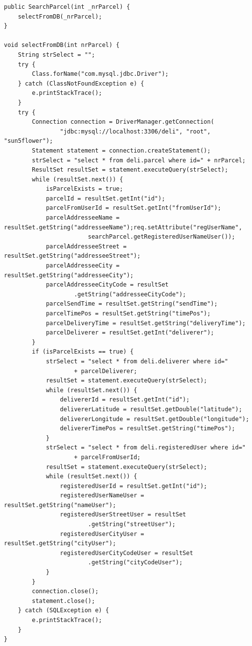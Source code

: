 \documentclass[eng,printmode,oneside]{mgr}
\begin{document}
\begin{lstlisting}[caption=Klasa reprezentująca
połączenie z bazą danych i pobierająca wszystkie dane o
przesyłce,label=searchparcel.java]
public SearchParcel(int _nrParcel) {
	selectFromDB(_nrParcel); 
}

void selectFromDB(int nrParcel) {
	String strSelect = "";
	try {
		Class.forName("com.mysql.jdbc.Driver");
	} catch (ClassNotFoundException e) {
		e.printStackTrace();
	}
	try {
		Connection connection = DriverManager.getConnection(
				"jdbc:mysql://localhost:3306/deli", "root", "sun5flower");
		Statement statement = connection.createStatement();
		strSelect = "select * from deli.parcel where id=" + nrParcel;
		ResultSet resultSet = statement.executeQuery(strSelect);
		while (resultSet.next()) {
			isParcelExists = true;
			parcelId = resultSet.getInt("id");
			parcelFromUserId = resultSet.getInt("fromUserId");
			parcelAddresseeName = resultSet.getString("addresseeName");req.setAttribute("regUserName",
						searchParcel.getRegisteredUserNameUser());
			parcelAddresseeStreet = resultSet.getString("addresseeStreet");
			parcelAddresseeCity = resultSet.getString("addresseeCity");
			parcelAddresseeCityCode = resultSet
					.getString("addresseeCityCode");
			parcelSendTime = resultSet.getString("sendTime");
			parcelTimePos = resultSet.getString("timePos");
			parcelDeliveryTime = resultSet.getString("deliveryTime");
			parcelDeliverer = resultSet.getInt("deliverer");
		}
		if (isParcelExists == true) {
			strSelect = "select * from deli.deliverer where id="
					+ parcelDeliverer;
			resultSet = statement.executeQuery(strSelect);
			while (resultSet.next()) {
				delivererId = resultSet.getInt("id");
				delivererLatitude = resultSet.getDouble("latitude");
				delivererLongitude = resultSet.getDouble("longitude");
				delivererTimePos = resultSet.getString("timePos");
			}
			strSelect = "select * from deli.registeredUser where id="
					+ parcelFromUserId;
			resultSet = statement.executeQuery(strSelect);
			while (resultSet.next()) {
				registeredUserId = resultSet.getInt("id");
				registeredUserNameUser = resultSet.getString("nameUser");
				registeredUserStreetUser = resultSet
						.getString("streetUser");
				registeredUserCityUser = resultSet.getString("cityUser");
				registeredUserCityCodeUser = resultSet
						.getString("cityCodeUser");
			}
		}
		connection.close();
		statement.close();
	} catch (SQLException e) {
		e.printStackTrace();
	}
}
\end{lstlisting}
\end{document}
